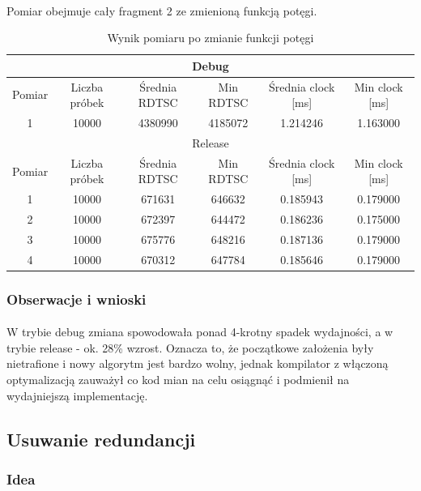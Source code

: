 \documentclass[12pt]{report}
\begin{document}
	\paragraph{}
	Pomiar obejmuje cały fragment 2 ze zmienioną funkcją potęgi.
	\begin{table}[H]
		\centering
		\caption{Wynik pomiaru po zmianie funkcji potęgi}
		\begin{tabular}{|c|c|c|c|c|c|} \hline
			\multicolumn{6}{|c|}{Debug} \\\hline
			Pomiar  & Liczba próbek & Średnia RDTSC & Min RDTSC & Średnia clock [ms] & Min clock [ms] \\\hline
			1 & 10000 & 4380990 & 4185072 & 1.214246 & 1.163000 \\\hline
			\hline
			\multicolumn{6}{|c|}{Release} \\\hline
			Pomiar  & Liczba próbek & Średnia RDTSC & Min RDTSC & Średnia clock [ms] & Min clock [ms] \\\hline
			1 & 10000 & 671631 & 646632 & 0.185943 & 0.179000 \\\hline
			2 & 10000 & 672397 & 644472 & 0.186236 & 0.175000 \\\hline
			3 & 10000 & 675776 & 648216 & 0.187136 & 0.179000 \\\hline
			4 & 10000 & 670312 & 647784 & 0.185646 & 0.179000 \\\hline
		\end{tabular}
	\end{table}
	
	\subsubsection{Obserwacje i wnioski}
	\paragraph{}
	W trybie debug zmiana spowodowała ponad 4-krotny spadek wydajności, a w trybie release - ok. 28\% wzrost.
	Oznacza to, że początkowe założenia były nietrafione i nowy algorytm jest bardzo wolny, jednak kompilator z włączoną optymalizacją zauważył co kod mian na celu osiągnąć i podmienił na wydajniejszą implementację.
	
	
	\pagebreak
	\subsection{Usuwanie redundancji}
	\subsubsection{Idea}
\end{document}
